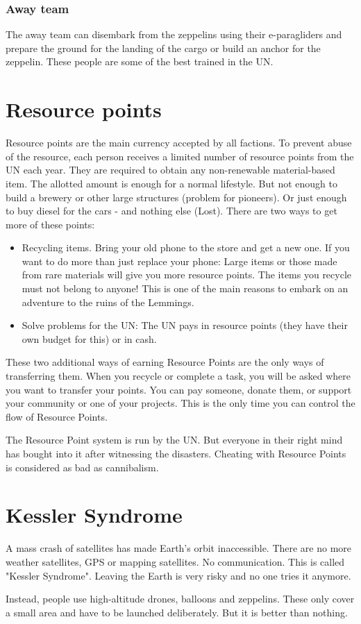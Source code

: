 \subsubsection{Away team}
\label{sec:UN away team}
The away team can disembark from the zeppelins using their e-paragliders and prepare the ground for the landing of the cargo or build an anchor for the zeppelin. These people are some of the best trained in the UN.

\section{Resource points}
\label{sec:Resource Points}
Resource points are the main currency accepted by all factions. To prevent abuse of the resource, each person receives a limited number of resource points from the UN each year. They are required to obtain any non-renewable material-based item. The allotted amount is enough for a normal lifestyle. But not enough to build a brewery or other large structures (problem for pioneers). Or just enough to buy diesel for the cars - and nothing else (Lost). There are two ways to get more of these points:

\begin{itemize}
    \item Recycling items. Bring your old phone to the store and get a new one. If you want to do more than just replace your phone: Large items or those made from rare materials will give you more resource points. The items you recycle must not belong to anyone! This is one of the main reasons to embark on an adventure to the ruins of the Lemmings.
    \item Solve problems for the UN: The UN pays in resource points (they have their own budget for this) or in cash.
\end{itemize}

These two additional ways of earning Resource Points are the only ways of transferring them. When you recycle or complete a task, you will be asked where you want to transfer your points. You can pay someone, donate them, or support your community or one of your projects. This is the only time you can control the flow of Resource Points.

The Resource Point system is run by the UN. But everyone in their right mind has bought into it after witnessing the disasters. Cheating with Resource Points is considered as bad as cannibalism.



\section{Kessler Syndrome}
\label{sec: Kessler Syndrome}
A mass crash of satellites has made Earth's orbit inaccessible. There are no more weather satellites, GPS or mapping satellites. No communication.
This is called "Kessler Syndrome". Leaving the Earth is very risky and no one tries it anymore.

Instead, people use high-altitude drones, balloons and zeppelins. These only cover a small area and have to be launched deliberately. But it is better than nothing.